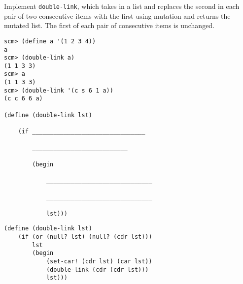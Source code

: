 \begin{blocksection}
\question Implement \texttt{double-link}, which takes in a list and replaces the second in 
each pair of two consecutive items with the first using mutation and returns the mutated list. 
The first of each pair of consecutive items is unchanged.

\begin{lstlisting}
scm> (define a '(1 2 3 4))
a
scm> (double-link a)
(1 1 3 3)
scm> a
(1 1 3 3)
scm> (double-link '(c s 6 1 a))
(c c 6 6 a)

(define (double-link lst)

    (if ________________________________

        ___________________________

        (begin

            ______________________________

            ______________________________
            
            lst)))
\end{lstlisting}

\begin{solution}
\begin{lstlisting}
(define (double-link lst)
    (if (or (null? lst) (null? (cdr lst))) 
        lst
        (begin
            (set-car! (cdr lst) (car lst))
            (double-link (cdr (cdr lst)))
            lst)))
\end{lstlisting}
\end{solution}
\end{blocksection}
